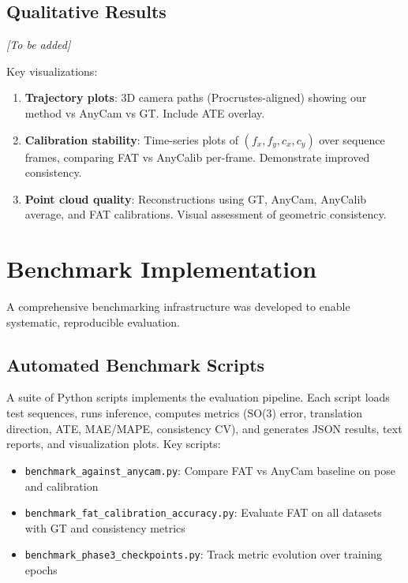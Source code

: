 \subsection{Qualitative Results}\label{sec:qualitative-results}

\emph{[To be added]}

Key visualizations:
\begin{enumerate}
    \item \textbf{Trajectory plots}: 3D camera paths (Procrustes-aligned) showing our method vs AnyCam vs GT. Include ATE overlay.
    \item \textbf{Calibration stability}: Time-series plots of $(f_x, f_y, c_x, c_y)$ over sequence frames, comparing FAT vs AnyCalib per-frame. Demonstrate improved consistency.
    \item \textbf{Point cloud quality}: Reconstructions using GT, AnyCam, AnyCalib average, and FAT calibrations. Visual assessment of geometric consistency.
\end{enumerate}

\section{Benchmark Implementation}\label{sec:benchmark-implementation}

A comprehensive benchmarking infrastructure was developed to enable systematic, reproducible evaluation.

\subsection{Automated Benchmark Scripts}

A suite of Python scripts implements the evaluation pipeline. Each script loads test sequences, runs inference, computes metrics (SO(3) error, translation direction, ATE, MAE/MAPE, consistency CV), and generates JSON results, text reports, and visualization plots. Key scripts:

\begin{itemize}
    \item \texttt{benchmark\_against\_anycam.py}: Compare FAT vs AnyCam baseline on pose and calibration
    \item \texttt{benchmark\_fat\_calibration\_accuracy.py}: Evaluate FAT on all datasets with GT and consistency metrics
    \item \texttt{benchmark\_phase3\_checkpoints.py}: Track metric evolution over training epochs
\end{itemize}

